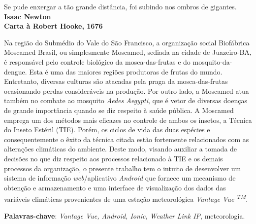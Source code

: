 \begin{epigrafe}
    \vspace*{\fill}
	\begin{flushright}
		Se pude enxergar a tão grande distância, foi subindo nos ombros de gigantes.\\
		 \vspace{\baselineskip}
		\textbf{Isaac Newton}\\
		\textbf{Carta à Robert Hooke, 1676}
	\end{flushright}
\end{epigrafe}


\setlength{\absparsep}{18pt} %
\begin{resumo}
	Na região do Submédio do Vale do São Francisco, a organização social Biofábrica Moscamed Brasil, ou simplesmente Moscamed, sediada na cidade de Juazeiro-BA, é responsável pelo controle biológico da mosca-das-frutas e do mosquito-da-dengue. Esta é uma das maiores regiões produtoras de frutas do mundo. Entretanto, diversas culturas são atacadas pela praga da mosca-das-frutas ocasionando perdas consideráveis na produção. Por outro lado, a Moscamed atua também no combate ao mosquito \textit{Aedes Aegypti}, que é vetor de diversas doenças de grande importância quando se diz respeito à saúde pública. A Moscamed emprega um dos métodos mais eficazes no controle de ambos os insetos, a Técnica do Inseto Estéril (TIE). Porém, os ciclos de vida das duas espécies e consequentemente o êxito da técnica citada estão fortemente relacionados com as alterações climáticas do ambiente. Deste modo, visando auxiliar a tomada de decisões no que diz respeito aos processos relacionado à TIE e os demais processos da organização, o presente trabalho tem o intuito de desenvolver um sistema de informação  \textit{web}/aplicativo \textit{Android} que fornece um mecanismo de obtenção e armazenamento e uma interface de visualização dos dados das variáveis climáticas provenientes de uma estação meteorológica \textit{Vantage Vue \textsuperscript{TM}}.

 \textbf{Palavras-chave}: \textit{Vantage Vue, Android, Ionic, Weather Link IP}, meteorologia.

\end{resumo}

